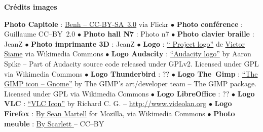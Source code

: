 
\vfill
\begin{center}
\textcolor{Cdl}{\textbf{Crédits images}} \par
{\tiny
 \textbf{Photo Capitole} : \href{https://www.flickr.com/photos/blieusong/6986608500/in/set-72157629942158013}{Benh  -- CC-BY-SA~3.0} via Flickr  \textcolor{Cdl}{$\bullet$}
 \textbf{Photo conférence } : Guillaume  CC--BY~2.0 \textcolor{Cdl}{$\bullet$}
 \textbf{Photo hall N7} : Photo n7 \textcolor{Cdl}{$\bullet$}
 \textbf{Photo clavier braille} : JeanZ \textcolor{Cdl}{$\bullet$}
 \textbf{Photo imprimante 3D} : JeanZ \textcolor{Cdl}{$\bullet$}
 \textbf{Logo } : \href{https://commons.wikimedia.org/wiki/File\%3AOfficial_gnu.svg"><img width="512" alt="Official gnu" src="//upload.wikimedia.org/wikipedia/commons/thumb/3/39/Official_gnu.svg/512px-Official_gnu.svg.png}{“ Project logo”} de \href{mailto:vcopovi@wanadoo.fr}{Victor Siame} via Wikimedia Commons \textcolor{Cdl}{$\bullet$}
 \textbf{Logo Audacity} : \href{https://commons.wikimedia.org/wiki/File:Audacity_Logo.svg#/media/File:Audacity_Logo.svg}{“Audacity logo”} by Aaron Spike -- Part of Audacity source code released under GPLv2. Licensed under GPL via Wikimedia Commons \textcolor{Cdl}{$\bullet$}
 \textbf{Logo Thunderbird} : ?? \textcolor{Cdl}{$\bullet$}
 \textbf{Logo The~Gimp} : \href{https://commons.wikimedia.org/wiki/File:The_GIMP_icon_-_gnome.svg#/media/File:The_GIMP_icon_-_gnome.svg}{“The GIMP icon -- Gnome”} by The GIMP's art/developer team -- The GIMP package. Licensed under GPL via Wikimedia Commons \textcolor{Cdl}{$\bullet$}
 \textbf{Logo LibreOffice} : ?? \textcolor{Cdl}{$\bullet$}
 \textbf{Logo VLC} : \href{https://commons.wikimedia.org/wiki/File:VLC_Icon.svg#/media/File:VLC_Icon.svg}{“VLC Icon”} by Richard C. G.  -- \url{http://www.videolan.org} \textcolor{Cdl}{$\bullet$}
 \textbf{Logo Firefox} : \href{https://commons.wikimedia.org/wiki/File\%3AMozilla_Firefox_logo_2013.svg}{By Sean Martell} for Mozilla, via Wikimedia Commons \textcolor{Cdl}{$\bullet$}
 \textbf{Photo meuble} : \href{https://www.opendesk.cc/fin/fin-lockers}{By Scarlett } -- CC--BY

}
\end{center}
